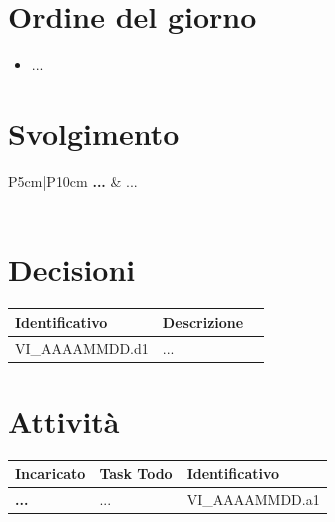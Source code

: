\documentclass[a4paper,12pt]{article}
\begin{document}
    

    \newpage
    \tableofcontents
    \newpage

    \section{Ordine del giorno}
        \begin{itemize}
            \item ...
        \end{itemize}

    \section{Svolgimento}
        \begin{longtable}{P{5cm}|P{10cm}} 
            \textbf{...} & ... \\\\
        \end{longtable}

    \section{Decisioni}
        \begin{tabularx}{\textwidth}{|l|X|l|}
            \hline
            \textbf{Identificativo} & \textbf{Descrizione}\\
            \hline
            VI\_AAAAMMDD.d1 & ... \\
            \hline
        \end{tabularx}

    \section{Attività}
        \begin{tabularx}{\textwidth}{|>{\raggedright\arraybackslash}p{4cm}|X|l|}
            \hline
            \textbf{Incaricato} & \textbf{Task Todo} & \textbf{Identificativo} \\
            \hline
            \textbf{...} & ... & VI\_AAAAMMDD.a1 \\
            \hline
        \end{tabularx}
\end{document}

